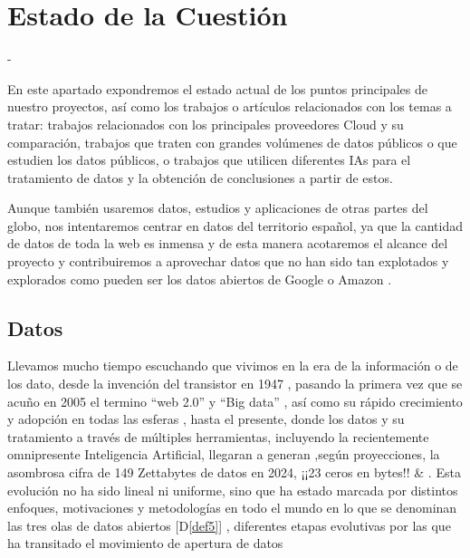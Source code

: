 \chapter{Estado de la Cuestión}
\label{cap:estadoDeLaCuestion}


-

En este apartado expondremos el estado actual de los puntos principales de nuestro proyectos, así como los trabajos o artículos relacionados con los temas a tratar: trabajos relacionados con los principales proveedores Cloud y su comparación, trabajos que traten con grandes volúmenes de datos públicos o que estudien los datos públicos, o trabajos que utilicen diferentes IAs para el tratamiento de datos y la obtención de conclusiones a partir de estos. 

Aunque también usaremos datos, estudios y aplicaciones de otras partes del globo, nos intentaremos centrar en datos del territorio español, ya que la cantidad de datos de toda la web es inmensa y de esta manera acotaremos el alcance del proyecto y contribuiremos a aprovechar datos que no han sido tan explotados y explorados como pueden ser los datos abiertos de Google \citep{googleDataCommon} o Amazon \citep{AWSDataCommon}. 

\section{Datos}

Llevamos mucho tiempo escuchando que vivimos en la era de la información o de los dato, desde la invención del transistor en 1947 \citep{wikiInformationAge}, pasando la primera vez que se acuño en 2005 el termino ``web 2.0''  y ``Big data''  \citep{HistoryOfBigData}, así como su rápido crecimiento y adopción en todas las esferas \citep{brown2011you}, hasta el presente, donde los datos y su tratamiento a través de múltiples herramientas, incluyendo la recientemente omnipresente Inteligencia Artificial, llegaran a generan ,según proyecciones, la asombrosa cifra de 149 Zettabytes de datos en 2024, ¡¡23 ceros en bytes!! \citep{BigDataStatista} \& \citep{BigDataStadisticsMarket}. Esta evolución no ha sido lineal ni uniforme, sino que ha estado marcada por distintos enfoques, motivaciones y metodologías en todo el mundo en lo que se denominan las tres olas de datos abiertos [D\ref{def5}] , diferentes etapas evolutivas por las que ha transitado el movimiento de apertura de datos

